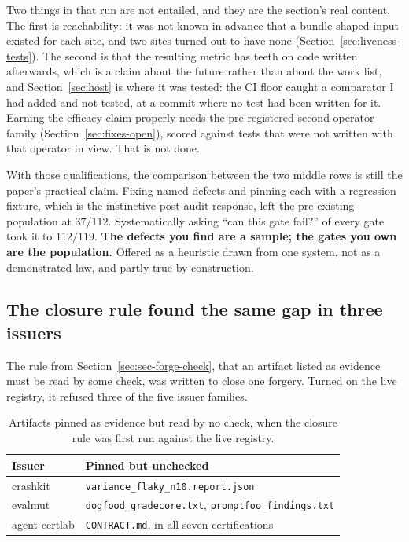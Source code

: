 \documentclass[11pt]{article}
\begin{document}
Two things in that run are not entailed, and they are the section's real content. The first
is reachability: it was not known in advance that a bundle-shaped input existed for each
site, and two sites turned out to have none (Section~\ref{sec:liveness-tests}). The second
is that the resulting metric has teeth on code written afterwards, which is a claim about
the future rather than about the work list, and Section~\ref{sec:host} is where it was
tested: the CI floor caught a comparator I had added and not tested, at a commit where no
test had been written for it. Earning the efficacy claim properly needs the pre-registered
second operator family (Section~\ref{sec:fixes-open}), scored against tests that were not
written with that operator in view. That is not done.

With those qualifications, the comparison between the two middle rows is still the paper's
practical claim. Fixing named defects and pinning each with a regression fixture, which is
the instinctive post-audit response, left the pre-existing population at $37/112$.
Systematically asking ``can this gate fail?'' of every gate took it to $112/119$.
\textbf{The defects you find are a sample; the gates you own are the population.} Offered as
a heuristic drawn from one system, not as a demonstrated law, and partly true by
construction.

\subsection{The closure rule found the same gap in three issuers}
\label{sec:closure}

The rule from Section~\ref{sec:sec-forge-check}, that an artifact listed as evidence must be
read by some check, was written to close one forgery. Turned on the live registry, it refused
three of the five issuer families.

\begin{table}[ht]
\centering
\caption{Artifacts pinned as evidence but read by no check, when the closure rule was first
run against the live registry.}
\label{tab:closure}
\begin{tabular}{ll}
\toprule
Issuer & Pinned but unchecked \\
\midrule
crashkit      & \texttt{variance\_flaky\_n10.report.json} \\
evalmut       & \texttt{dogfood\_gradecore.txt}, \texttt{promptfoo\_findings.txt} \\
agent-certlab & \texttt{CONTRACT.md}, in all seven certifications \\
\bottomrule
\end{tabular}
\end{table}
\end{document}
